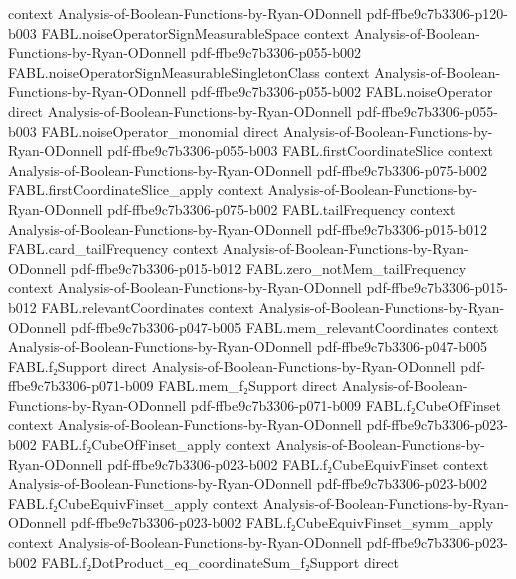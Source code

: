 \begin{theorem}
  {context}
  {Analysis-of-Boolean-Functions-by-Ryan-ODonnell}
  {pdf-ffbe9c7b3306-p120-b003}
\proofstep
  {FABL.noiseOperatorSignMeasurableSpace}
  {context}
  {Analysis-of-Boolean-Functions-by-Ryan-ODonnell}
  {pdf-ffbe9c7b3306-p055-b002}
\proofstep
  {FABL.noiseOperatorSignMeasurableSingletonClass}
  {context}
  {Analysis-of-Boolean-Functions-by-Ryan-ODonnell}
  {pdf-ffbe9c7b3306-p055-b002}
\proofstep
  {FABL.noiseOperator}
  {direct}
  {Analysis-of-Boolean-Functions-by-Ryan-ODonnell}
  {pdf-ffbe9c7b3306-p055-b003}
\proofstep
  {FABL.noiseOperator_monomial}
  {direct}
  {Analysis-of-Boolean-Functions-by-Ryan-ODonnell}
  {pdf-ffbe9c7b3306-p055-b003}
\proofstep
  {FABL.firstCoordinateSlice}
  {context}
  {Analysis-of-Boolean-Functions-by-Ryan-ODonnell}
  {pdf-ffbe9c7b3306-p075-b002}
\proofstep
  {FABL.firstCoordinateSlice_apply}
  {context}
  {Analysis-of-Boolean-Functions-by-Ryan-ODonnell}
  {pdf-ffbe9c7b3306-p075-b002}
\proofstep
  {FABL.tailFrequency}
  {context}
  {Analysis-of-Boolean-Functions-by-Ryan-ODonnell}
  {pdf-ffbe9c7b3306-p015-b012}
\proofstep
  {FABL.card_tailFrequency}
  {context}
  {Analysis-of-Boolean-Functions-by-Ryan-ODonnell}
  {pdf-ffbe9c7b3306-p015-b012}
\proofstep
  {FABL.zero_notMem_tailFrequency}
  {context}
  {Analysis-of-Boolean-Functions-by-Ryan-ODonnell}
  {pdf-ffbe9c7b3306-p015-b012}
\proofstep
  {FABL.relevantCoordinates}
  {context}
  {Analysis-of-Boolean-Functions-by-Ryan-ODonnell}
  {pdf-ffbe9c7b3306-p047-b005}
\proofstep
  {FABL.mem_relevantCoordinates}
  {context}
  {Analysis-of-Boolean-Functions-by-Ryan-ODonnell}
  {pdf-ffbe9c7b3306-p047-b005}
\proofstep
  {FABL.f₂Support}
  {direct}
  {Analysis-of-Boolean-Functions-by-Ryan-ODonnell}
  {pdf-ffbe9c7b3306-p071-b009}
\proofstep
  {FABL.mem_f₂Support}
  {direct}
  {Analysis-of-Boolean-Functions-by-Ryan-ODonnell}
  {pdf-ffbe9c7b3306-p071-b009}
\proofstep
  {FABL.f₂CubeOfFinset}
  {context}
  {Analysis-of-Boolean-Functions-by-Ryan-ODonnell}
  {pdf-ffbe9c7b3306-p023-b002}
\proofstep
  {FABL.f₂CubeOfFinset_apply}
  {context}
  {Analysis-of-Boolean-Functions-by-Ryan-ODonnell}
  {pdf-ffbe9c7b3306-p023-b002}
\proofstep
  {FABL.f₂CubeEquivFinset}
  {context}
  {Analysis-of-Boolean-Functions-by-Ryan-ODonnell}
  {pdf-ffbe9c7b3306-p023-b002}
\proofstep
  {FABL.f₂CubeEquivFinset_apply}
  {context}
  {Analysis-of-Boolean-Functions-by-Ryan-ODonnell}
  {pdf-ffbe9c7b3306-p023-b002}
\proofstep
  {FABL.f₂CubeEquivFinset_symm_apply}
  {context}
  {Analysis-of-Boolean-Functions-by-Ryan-ODonnell}
  {pdf-ffbe9c7b3306-p023-b002}
\proofstep
  {FABL.f₂DotProduct_eq_coordinateSum_f₂Support}
  {direct}

\end{theorem}
